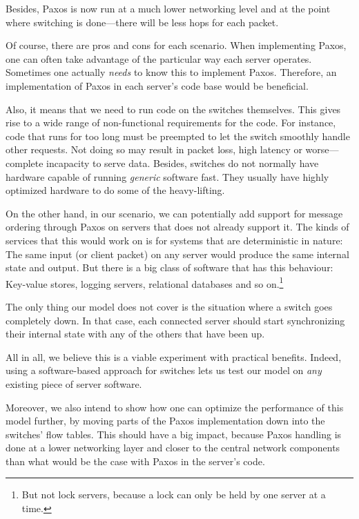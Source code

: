 Besides, Paxos is now run at a much lower networking level and at the point where switching is done---there will be less hops
for each packet.

Of course, there are pros and cons for each scenario.
When implementing Paxos, one can often take advantage of
the particular way each server operates. Sometimes one actually
\textit{needs} to know this to implement Paxos.  Therefore, an
implementation of Paxos in each server's code base would be beneficial.

Also, it means that we need to run code on the switches themselves. This
gives rise to a wide range of non-functional requirements for the code.
For instance, code that runs for too long must be
preempted to let the switch smoothly handle other
requests. Not doing so may result in packet loss, high latency or
worse---complete incapacity to serve data. Besides, switches do not normally
have hardware capable of running \textit{generic} software fast. They
usually have highly optimized hardware to do some of the heavy-lifting.

On the other hand, in our scenario, we can potentially add support for
message ordering through Paxos on servers that does not already support it.
The kinds of services that this would work on is for systems that are
deterministic in nature: The same input (or client packet) on any server
would produce the same internal state and output.
%
But there is a big class of software that has this behaviour:  Key-value
stores, logging servers, relational databases and so on.\footnote{But not
lock servers, because a lock can only be held by one server at a time.}

The only thing our model does not cover is the situation where a switch goes
completely down.
In that case, each connected server should start
synchronizing their internal state with any of the others that have been up.

All in all, we believe this is a viable experiment with practical benefits.
Indeed, using a software-based approach for switches lets us test our model
on \textit{any} existing piece of server software.

Moreover, we also intend to show how one can optimize the performance of
this model further, by moving parts of the Paxos implementation down into
the switches' flow tables.  This should have a big impact, because Paxos
handling is done at a lower networking layer and closer to the central network
components than what would be the case with Paxos in the server's code.


